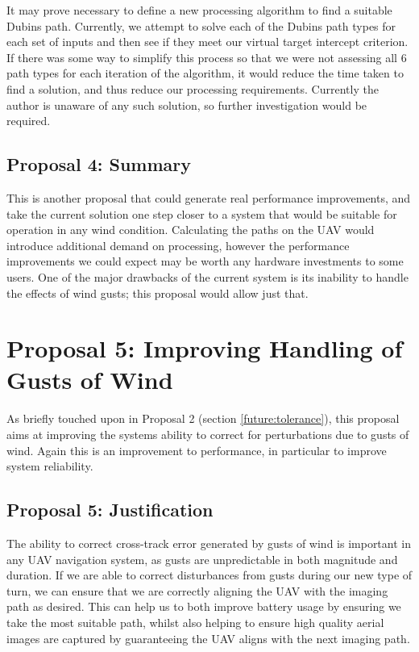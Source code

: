 It may prove necessary to define a new processing algorithm to find a suitable Dubins path. Currently, we attempt to solve each of the Dubins path types for each set of inputs and then see if they meet our virtual target intercept criterion. If there was some way to simplify this process so that we were not assessing all 6 path types for each iteration of the algorithm, it would reduce the time taken to find a solution, and thus reduce our processing requirements. Currently the author is unaware of any such solution, so further investigation would be required.

\subsection{Proposal 4: Summary} 
\label{future:onboardsummary}

This is another proposal that could generate real performance improvements, and take the current solution one step closer to a system that would be suitable for operation in any wind condition. Calculating the paths on the UAV would introduce additional demand on processing, however the performance improvements we could expect may be worth any hardware investments to some users. One of the major drawbacks of the current system is its inability to handle the effects of wind gusts; this proposal would allow just that. 

\section{Proposal 5: Improving Handling of Gusts of Wind} 
\label{future:gusts}

As briefly touched upon in Proposal 2 (section \ref{future:tolerance}), this proposal aims at improving the systems ability to correct for perturbations due to gusts of wind. Again this is an improvement to performance, in particular to improve system reliability. 

\subsection{Proposal 5: Justification}
\label{future:gustsreason}

The ability to correct cross-track error generated by gusts of wind is important in any UAV navigation system, as gusts are unpredictable in both magnitude and duration. If we are able to correct disturbances from gusts during our new type of turn, we can ensure that we are correctly aligning the UAV with the imaging path as desired. This can help us to both improve battery usage by ensuring we take the most suitable path, whilst also helping to ensure high quality aerial images are captured by guaranteeing the UAV aligns with the next imaging path. 

